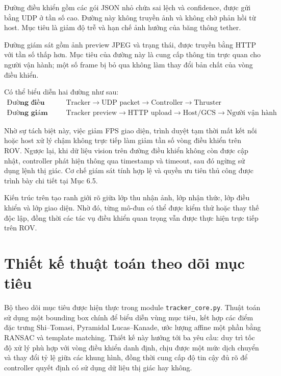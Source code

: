 \documentclass[../DoAn.tex]{subfiles}
\begin{document}
Đường điều khiển gồm các gói JSON nhỏ chứa sai lệch và confidence, được gửi bằng UDP ở tần số cao. Đường này không truyền ảnh và không chờ phản hồi từ host. Mục tiêu là giảm độ trễ và hạn chế ảnh hưởng của băng thông tether.

Đường giám sát gồm ảnh preview JPEG và trạng thái, được truyền bằng HTTP với tần số thấp hơn. Mục tiêu của đường này là cung cấp thông tin trực quan cho người vận hành; một số frame bị bỏ qua không làm thay đổi bản chất của vòng điều khiển.

Có thể biểu diễn hai đường như sau:
\[
\begin{aligned}
\textbf{Đường điều khiển: } & \text{Tracker} \longrightarrow \text{UDP packet} \longrightarrow \text{Controller} \longrightarrow \text{Thruster} \\
\textbf{Đường giám sát: } & \text{Tracker preview} \longrightarrow \text{HTTP upload} \longrightarrow \text{Host/GCS} \longrightarrow \text{Người vận hành}
\end{aligned}
\]

Nhờ sự tách biệt này, việc giảm FPS giao diện, trình duyệt tạm thời mất kết nối hoặc host xử lý chậm không trực tiếp làm giảm tần số vòng điều khiển trên ROV. Ngược lại, khi dữ liệu vision trên đường điều khiển không còn được cập nhật, controller phát hiện thông qua timestamp và timeout, sau đó ngừng sử dụng lệnh thị giác. Cơ chế giám sát tính hợp lệ và quyền ưu tiên thủ công được trình bày chi tiết tại Mục 6.5.

Kiến trúc trên tạo ranh giới rõ giữa lớp thu nhận ảnh, lớp nhận thức, lớp điều khiển và lớp giao diện. Nhờ đó, từng mô-đun có thể được kiểm thử hoặc thay thế độc lập, đồng thời các tác vụ điều khiển quan trọng vẫn được thực hiện trực tiếp trên ROV.

\section{Thiết kế thuật toán theo dõi mục tiêu}

Bộ theo dõi mục tiêu được hiện thực trong module \texttt{tracker\_core.py}. Thuật toán sử dụng một bounding box chính để biểu diễn vùng mục tiêu, kết hợp các điểm đặc trưng Shi--Tomasi, Pyramidal Lucas--Kanade, ước lượng affine một phần bằng RANSAC và template matching. Thiết kế này hướng tới ba yêu cầu: duy trì tốc độ xử lý phù hợp với vòng điều khiển danh định, chịu được một mức dịch chuyển và thay đổi tỷ lệ giữa các khung hình, đồng thời cung cấp độ tin cậy đủ rõ để controller quyết định có sử dụng dữ liệu thị giác hay không.
\end{document}
